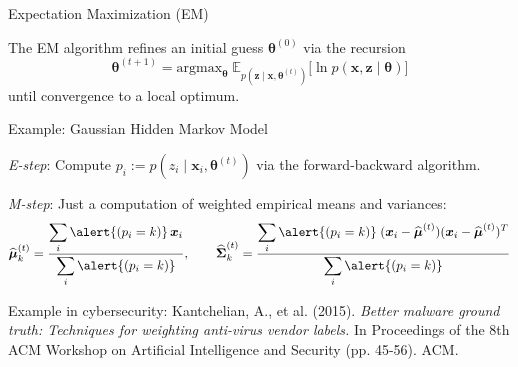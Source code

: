 \documentclass[10pt]{beamer}
\newcommand{\ds}{\displaystyle}
\newcommand{\df}{\displaystyle\frac}
\newcommand{\+}[1]{\ensuremath{{\boldsymbol #1}}} %
\newcommand{\cond}{\; | \;}
\newcommand{\E}{\mathbb{E}}
\newcommand{\Q}{\mathcal{Q}}
\newcommand{\wrt}[1]{\; d \,{#1} \;}
\newcommand{\VLBO}{\,\texttt{VLBO}\,}
\begin{document}
\begin{frame}{Expectation Maximization (EM)}

The EM algorithm refines an initial guess $\+\theta^{(0)}$ via the recursion
\[ \+\theta^{(t+1)} =  \text{argmax}_{\+\theta} \; \E_{p(\+z \cond \+x , \+\theta^{(t)})} \bigg[ \ln p(\+x, \+z \cond \+\theta) \bigg] \]
until convergence to a local optimum.

\begin{block}{Example: Gaussian Hidden Markov Model}

\textit{E-step}:  Compute $p_i := p(z_i \cond \+x_i, \+\theta^{(t)})$ via the forward-backward algorithm. 

\textit{M-step}: Just a computation of \alert{weighted} empirical means and variances:
\[ \widehat{\+\mu}_k^{(t)} = \df{\ds\sum_i \alert{(p_i = k)} \, \+x_i}{\ds\sum_i \alert{(p_i=k)}},  \quad \quad \widehat{\+\Sigma}_k^{(t)} = \df{\ds\sum_i \alert{(p_i = k)} \; (\+x_i-\widehat{\+\mu}^{(t)}) (\+x_i-\widehat{\+\mu}^{(t)})^T }{\ds\sum_i \alert{(p_i = k)}} \] 
\end{block}

\vfill \vfill

\tiny Example in cybersecurity: Kantchelian, A., et al. (2015). \textit{Better malware ground truth: Techniques for weighting anti-virus vendor labels.} In Proceedings of the 8th ACM Workshop on Artificial Intelligence and Security (pp. 45-56). ACM.


\end{frame}


%
%
%
%
\end{document}
